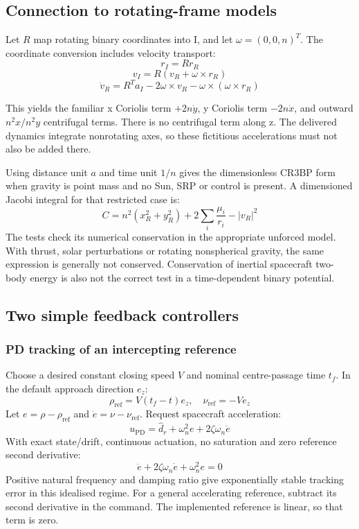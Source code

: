 \documentclass[11pt,a4paper]{article}
\begin{document}
\subsection{Connection to rotating-frame models}
Let $R$ map rotating binary coordinates into I, and let $\omega = (0, 0, n)^T$. The coordinate conversion includes velocity transport:
\[ r_{I} = R r_{R} \]
\[ v_{I} = R (v_{R} + \omega \times r_{R}) \]
\[ \dot{v}_{R} = R^{T} a_{I} - 2\omega \times v_{R} - \omega \times (\omega \times r_{R}) \]

This yields the familiar x Coriolis term $+2n \dot{y}$, y Coriolis term $-2n \dot{x}$, and outward $n^{2}x / n^{2}y$ centrifugal terms. There is no centrifugal term along z. The delivered dynamics integrate nonrotating axes, so these fictitious accelerations must not also be added there.

Using distance unit $a$ and time unit $1/n$ gives the dimensionless CR3BP form when gravity is point mass and no Sun, SRP or control is present. A dimensioned Jacobi integral for that restricted case is:
\[ C = n^{2}(x_{R}^{2} + y_{R}^{2}) + 2\sum_{i} \frac{\mu_{i}}{r_{i}} - |v_{R}|^{2} \]
The tests check its numerical conservation in the appropriate unforced model. With thrust, solar perturbations or rotating nonspherical gravity, the same expression is generally not conserved. Conservation of inertial spacecraft two-body energy is also not the correct test in a time-dependent binary potential.

\subsection{Two simple feedback controllers}

\subsubsection{PD tracking of an intercepting reference}
Choose a desired constant closing speed $V$ and nominal centre-passage time $t_f$. In the default approach direction $e_z$:
\[ \rho_{\mathrm{ref}} = V(t_{f} - t) e_{z}, \quad \nu_{\mathrm{ref}} = -V e_{z} \]
Let $e = \rho - \rho_{\mathrm{ref}}$ and $\dot{e} = \nu - \nu_{\mathrm{ref}}$. Request spacecraft acceleration:
\[ u_{\mathrm{PD}} = \hat{d}_{r} + \omega_{n}^{2} e + 2\zeta \omega_{n} \dot{e} \]
With exact state/drift, continuous actuation, no saturation and zero reference second derivative:
\[ \ddot{e} + 2\zeta \omega_{n} \dot{e} + \omega_{n}^{2} e = 0 \]
Positive natural frequency and damping ratio give exponentially stable tracking error in this idealised regime. For a general accelerating reference, subtract its second derivative in the command. The implemented reference is linear, so that term is zero.
\end{document}
